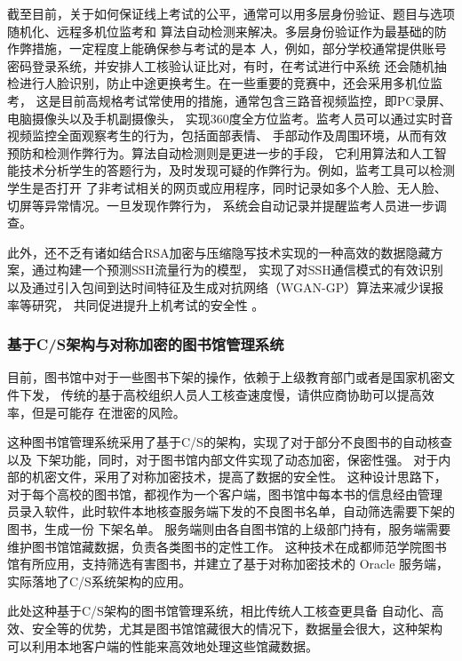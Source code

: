 截至目前，关于如何保证线上考试的公平，通常可以用多层身份验证、题目与选项随机化、远程多机位监考和
算法自动检测来解决。多层身份验证作为最基础的防作弊措施，一定程度上能确保参与考试的是本
人，例如，部分学校通常提供账号密码登录系统，并安排人工核验认证比对，有时，在考试进行中系统
还会随机抽检进行人脸识别，防止中途更换考生。在一些重要的竞赛中，还会采用多机位监考，
这是目前高规格考试常使用的措施，通常包含三路音视频监控，即PC录屏、电脑摄像头以及手机副摄像头，
实现360度全方位监考。监考人员可以通过实时音视频监控全面观察考生的行为，包括面部表情、
手部动作及周围环境，从而有效预防和检测作弊行为。算法自动检测则是更进一步的手段，
它利用算法和人工智能技术分析学生的答题行为，及时发现可疑的作弊行为。例如，监考工具可以检测学生是否打开
了非考试相关的网页或应用程序，同时记录如多个人脸、无人脸、切屏等异常情况。一旦发现作弊行为，
系统会自动记录并提醒监考人员进一步调查。

此外，还不乏有诸如结合RSA加密与压缩隐写技术实现的一种高效的数据隐藏方案，通过构建一个预测SSH流量行为的模型，
实现了对SSH通信模式的有效识别\cite{ImSSH}以及通过引入包间到达时间特征及生成对抗网络（WGAN-GP）算法来减少误报率等研究，
共同促进提升上机考试的安全性\cite{9356603} \cite{Lee2022}。

\subsubsection{基于C/S架构与对称加密的图书馆管理系统}

目前，图书馆中对于一些图书下架的操作，依赖于上级教育部门或者是国家机密文件下发，
传统的基于高校组织人员人工核查速度慢，请供应商协助可以提高效率，但是可能存
在泄密的风险\cite{Zhou2022}\cite{Yu2019}\cite{Cai1994}。

这种图书馆管理系统采用了基于C/S的架构，实现了对于部分不良图书的自动核查以及
下架功能，同时，对于图书馆内部文件实现了动态加密，保密性强。
对于内部的机密文件，采用了对称加密技术，提高了数据的安全性\cite{Chen1995}。
这种设计思路下，对于每个高校的图书馆，都视作为一个客户端，图书馆中每本书的信息经由管理
员录入软件，此时软件本地核查服务端下发的不良图书名单，自动筛选需要下架的图书，生成一份
下架名单。
服务端则由各自图书馆的上级部门持有，服务端需要维护图书馆馆藏数据，负责各类图书的定性工作。
这种技术在成都师范学院图书馆有所应用，支持筛选有害图书，并建立了基于对称加密技术的
Oracle 服务端，实际落地了C/S系统架构的应用。

此处这种基于C/S架构的图书馆管理系统，相比传统人工核查更具备
自动化、高效、安全等的优势，尤其是图书馆馆藏很大的情况下，数据量会很大，这种架构
可以利用本地客户端的性能来高效地处理这些馆藏数据。

